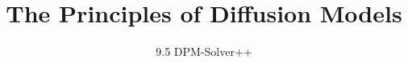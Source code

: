 
\title{The Principles of Diffusion Models}
\subtitle{9.5 DPM-Solver++}


\begin{frame}
    \titlepage
\end{frame}



